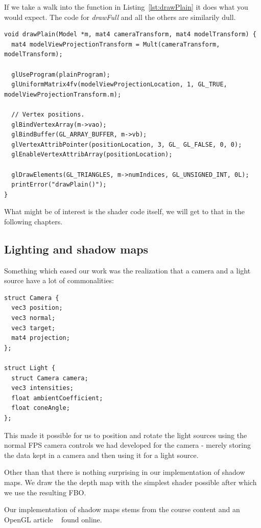 \documentclass[a4paper,12pt]{article}
\begin{document}
If we take a walk into the function in Listing~\ref{lst:drawPlain} it does what you would expect. The code for \emph{drawFull} and all the others are similarily dull.

\begin{lstlisting}[label=lst:drawPlain,caption= The contents of the drawPlain function.]
void drawPlain(Model *m, mat4 cameraTransform, mat4 modelTransform) {
  mat4 modelViewProjectionTransform = Mult(cameraTransform, modelTransform);

  glUseProgram(plainProgram);
  glUniformMatrix4fv(modelViewProjectionLocation, 1, GL_TRUE, modelViewProjectionTransform.m);

  // Vertex positions.
  glBindVertexArray(m->vao);
  glBindBuffer(GL_ARRAY_BUFFER, m->vb);
  glVertexAttribPointer(positionLocation, 3, GL_ GL_FALSE, 0, 0);
  glEnableVertexAttribArray(positionLocation);

  glDrawElements(GL_TRIANGLES, m->numIndices, GL_UNSIGNED_INT, 0L);
  printError("drawPlain()");
}
\end{lstlisting}

What might be of interest is the shader code itself, we will get to that in the following chapters.


\subsection{Lighting and shadow maps}

Something which eased our work was the realization that a camera and a light source have a lot of commonalities:

\begin{lstlisting}[label=lst:lamp-struct,caption=Light source struct]
struct Camera {
  vec3 position;
  vec3 normal;
  vec3 target;
  mat4 projection;
};

struct Light {
  struct Camera camera;
  vec3 intensities;
  float ambientCoefficient;
  float coneAngle;
};
\end{lstlisting}

This made it possible for us to position and rotate the light sources using the normal FPS camera controls we had developed for the camera - merely storing the data kept in a camera and then using it for a light source.

Other than that there is nothing surprising in our implementation of shadow maps. We draw the the depth map with the simplest shader possible after which we use the resulting FBO.

Our implementation of shadow maps stems from the course content and an OpenGL article ~\cite{shadow-maps-tutorial} found online.
\end{document}
